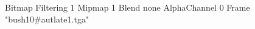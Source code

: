 {Bitmap
	{Filtering 1}
	{Mipmap 1}
	{Blend none}
	{AlphaChannel 0}
	{Frame "bush10#autlate1.tga"}
}
